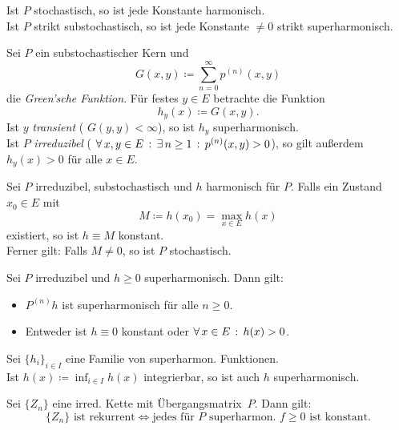 \documentclass{cheat-sheet}
\begin{document}
\begin{bem}
  Ist $P$ stochastisch, so ist jede Konstante harmonisch. \\
  Ist $P$ strikt substochastisch, so ist jede Konstante $\neq 0$ strikt superharmonisch.
\end{bem}

\begin{bsp}
  Sei $P$ ein substochastischer Kern und
  \[ G(x, y) \coloneqq {\sum}_{n=0}^\infty p^{(n)}(x, y) \]
  die \textit{Green'sche Funktion}.
  Für festes $y \in E$ betrachte die Funktion
  \[ h_y(x) \coloneqq G(x, y). \]
  Ist $y$ \textit{transient} (\dh{} $G(y, y) < \infty$), so ist $h_y$ superharmonisch. \\
  Ist $P$ \textit{irreduzibel} (\dh{} $\forall \, {x, y \in E} \,:\, \exists \, {n \geq 1} \,:\, p^{(n)}(x, y) > 0$), so gilt außerdem $h_y(x) > 0$ für alle $x \in E$.
\end{bsp}

\begin{lem}
  Sei $P$ irreduzibel, substochastisch und $h$ harmonisch für $P$.
  Falls ein Zustand $x_0 \in E$ mit
  \[
    M \coloneqq h(x_0) = \max_{x \in E} h(x)
  \]
  existiert, so ist $h \equiv M$ konstant. \\
  Ferner gilt: Falls $M \neq 0$, so ist $P$ stochastisch.
\end{lem}

\begin{lem}
  Sei $P$ irreduzibel und $h \geq 0$ superharmonisch.
  Dann gilt:
  \begin{itemize}
    \item $P^{(n)} h$ ist superharmonisch für alle $n \geq 0$.
    \item Entweder ist $h \equiv 0$ konstant oder $\forall \, {x \in E} \,:\, h(x) > 0$.
  \end{itemize}
\end{lem}

\begin{lem}
  Sei $\{ h_i \}_{i \in I}$ eine Familie von superharmon. Funktionen. \\
  Ist $h(x) \coloneqq {\inf}_{i \in I} h(x)$ integrierbar, so ist auch $h$ superharmonisch.
\end{lem}

\begin{satz}
  Sei $\{ Z_n \}$ eine irred. Kette mit Übergangsmatrix~$P$.
  Dann gilt:
  \[
    \{ Z_n \} \text{ ist rekurrent} \iff
    \text{jedes für~$P$ superharmon. $f \geq 0$ ist konstant}.
  \]
\end{satz}
\end{document}

